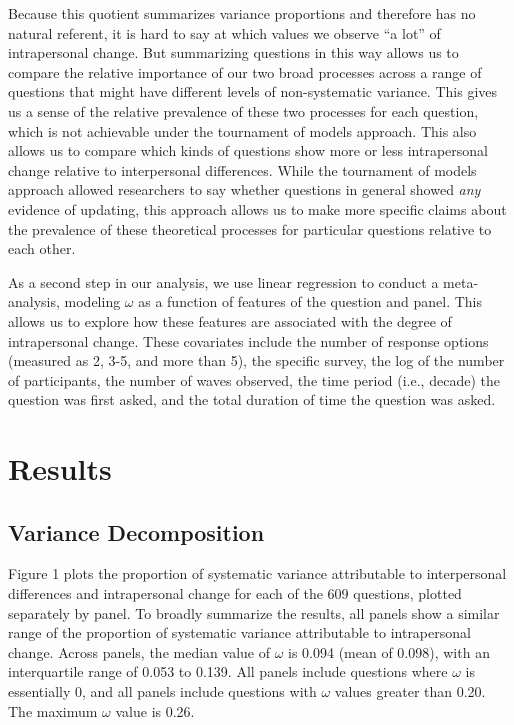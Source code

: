 \documentclass[
  12pt,
]{article}
\begin{document}
Because this quotient summarizes variance proportions and therefore has
no natural referent, it is hard to say at which values we observe ``a
lot'' of intrapersonal change. But summarizing questions in this way
allows us to compare the relative importance of our two broad processes
across a range of questions that might have different levels of
non-systematic variance. This gives us a sense of the relative
prevalence of these two processes for each question, which is not
achievable under the tournament of models approach. This also allows us
to compare which kinds of questions show more or less intrapersonal
change relative to interpersonal differences. While the tournament of
models approach allowed researchers to say whether questions in general
showed \emph{any} evidence of updating, this approach allows us to make
more specific claims about the prevalence of these theoretical processes
for particular questions relative to each other.

As a second step in our analysis, we use linear regression to conduct a
meta-analysis, modeling \(\omega\) as a function of features of the
question and panel. This allows us to explore how these features are
associated with the degree of intrapersonal change. These covariates
include the number of response options (measured as 2, 3-5, and more
than 5), the specific survey, the log of the number of participants, the
number of waves observed, the time period (i.e., decade) the question
was first asked, and the total duration of time the question was asked.

\hypertarget{results}{%
\section{Results}\label{results}}

\hypertarget{variance-decomposition}{%
\subsection{Variance Decomposition}\label{variance-decomposition}}

Figure 1 plots the proportion of systematic variance attributable to
interpersonal differences and intrapersonal change for each of the 609
questions, plotted separately by panel. To broadly summarize the
results, all panels show a similar range of the proportion of systematic
variance attributable to intrapersonal change. Across panels, the median
value of \(\omega\) is 0.094 (mean of 0.098), with an interquartile
range of 0.053 to 0.139. All panels include questions where \(\omega\)
is essentially 0, and all panels include questions with \(\omega\)
values greater than 0.20. The maximum \(\omega\) value is 0.26.
\end{document}
